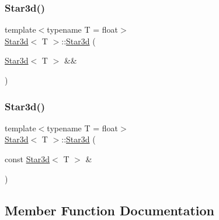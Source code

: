 \mbox{\label{classStar3d_a6793481605da65706c5fc9ca1d4b82ad}} 
\subsubsection{\texorpdfstring{Star3d()}{Star3d()}\hspace{0.1cm}{\footnotesize\ttfamily [2/3]}}
{\footnotesize\ttfamily template$<$typename T  = float$>$ \\
\mbox{\hyperlink{classStar3d}{Star3d}}$<$ T $>$\+::\mbox{\hyperlink{classStar3d}{Star3d}} (\begin{DoxyParamCaption}\item[{\mbox{\hyperlink{classStar3d}{Star3d}}$<$ T $>$ \&\&}]{ }\end{DoxyParamCaption})\hspace{0.3cm}{\ttfamily [default]}}

\mbox{\label{classStar3d_a5f4b217dd7926f73faaa57766546b022}} 
\subsubsection{\texorpdfstring{Star3d()}{Star3d()}\hspace{0.1cm}{\footnotesize\ttfamily [3/3]}}
{\footnotesize\ttfamily template$<$typename T  = float$>$ \\
\mbox{\hyperlink{classStar3d}{Star3d}}$<$ T $>$\+::\mbox{\hyperlink{classStar3d}{Star3d}} (\begin{DoxyParamCaption}\item[{const \mbox{\hyperlink{classStar3d}{Star3d}}$<$ T $>$ \&}]{ }\end{DoxyParamCaption})\hspace{0.3cm}{\ttfamily [default]}}



\subsection{Member Function Documentation}
\mbox{\label{classStar3d_a43617f398a59d73eb85df49539f9efa5}} 
